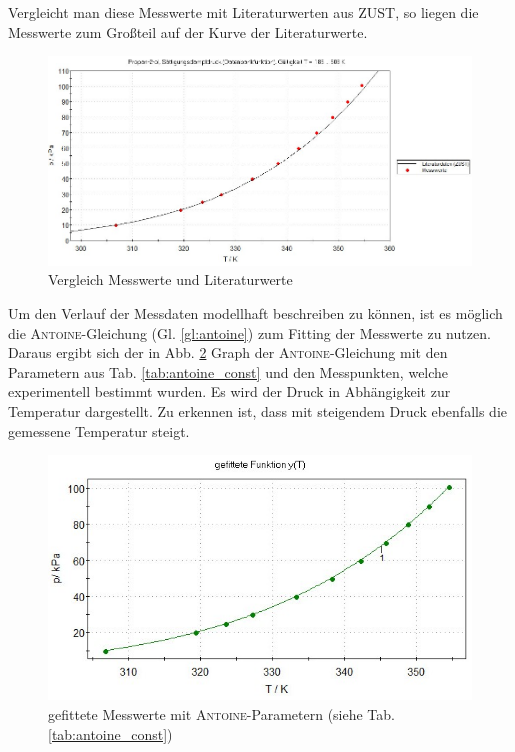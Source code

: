 Vergleicht man diese Messwerte mit Literaturwerten aus \textsc{ZUST}, so liegen die Messwerte zum Großteil auf der Kurve der Literaturwerte.

\begin{figure}[h!]
	\centering
	\includegraphics[width=1.0\textwidth]{img/literatur}
	\caption{Vergleich Messwerte und Literaturwerte}
	\label{fig:literatur}
\end{figure}
\FloatBarrier

Um den Verlauf der Messdaten  modellhaft beschreiben zu können, ist es möglich die \textsc{Antoine}-Gleichung (Gl. \ref{gl:antoine}) zum Fitting der Messwerte zu nutzen. Daraus ergibt sich der in Abb. \ref{fig:antoine_fit} Graph der \textsc{Antoine}-Gleichung mit den Parametern aus Tab. \ref{tab:antoine_const} und den Messpunkten, welche experimentell bestimmt wurden. \linebreak 
Es wird der Druck in Abhängigkeit zur Temperatur dargestellt. Zu erkennen ist, dass mit steigendem Druck ebenfalls die gemessene Temperatur steigt.


\begin{figure}[h!]
	\centering
	\includegraphics[width=1.0\textwidth]{img/antoine_fit}
	\caption{gefittete Messwerte mit \textsc{Antoine}-Parametern (siehe Tab. \ref{tab:antoine_const})}
	\label{fig:antoine_fit}
\end{figure}
\FloatBarrier

